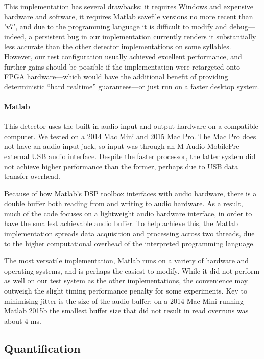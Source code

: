 \documentclass[10pt,letterpaper]{article}
\renewcommand{\subsubsection}[1]{\paragraph{#1}}
\begin{document}
This implementation has several drawbacks: it requires Windows and expensive hardware and software, it requires Matlab savefile versions no more recent than 'v7', and due to the programming language it is difficult to modify and debug---indeed, a persistent bug in our implementation currently renders it substantially less accurate than the other detector implementations on some syllables. However, our test configuration usually achieved excellent performance, and further gains should be possible if the implementation were retargeted onto FPGA hardware---which would have the additional benefit of providing deterministic ``hard realtime'' guarantees---or just run on a faster desktop system.

\subsubsection{Matlab}

This detector uses the built-in audio input and output hardware on a compatible computer.  We tested on a 2014 Mac Mini and 2015 Mac Pro.  The Mac Pro does not have an audio input jack, so input was through an M-Audio MobilePre external USB audio interface.  Despite the faster processor, the latter system did not achieve higher performance than the former, perhaps due to USB data transfer overhead.

Because of how Matlab's DSP toolbox interfaces with audio hardware, there is a double buffer both reading from and writing to audio hardware. As a result, much of the code focuses on a lightweight audio hardware interface, in order to have the smallest achievable audio buffer. To help achieve this, the Matlab implementation spreads data acquisition and processing across two threads, due to the higher computational overhead of the interpreted programming language.

The most versatile implementation, Matlab runs on a variety of hardware and operating systems, and is perhaps the easiest to modify.  While it did not perform as well on our test system as the other implementations, the convenience may outweigh the slight timing performance penalty for some experiments.  Key to minimising jitter is the size of the audio buffer: on a 2014 Mac Mini running Matlab 2015b the smallest buffer size that did not result in read overruns was about 4 ms.

\subsection{Quantification}
\label{sec:quantify}
\end{document}
